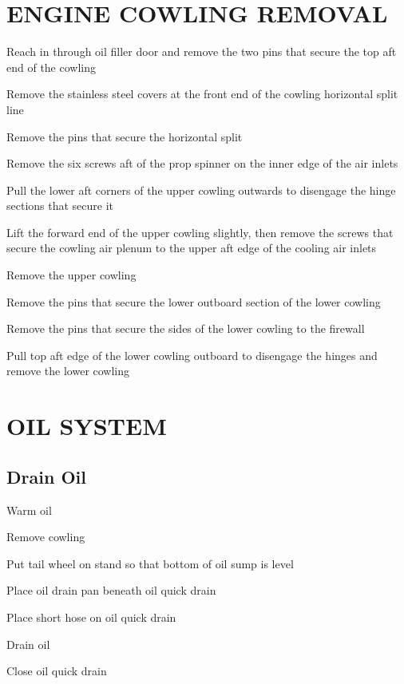 \section{ENGINE COWLING REMOVAL}
\begin{enumerate*}
    \item Reach in through oil filler door and remove the two pins that secure the top aft end of the cowling
    \item Remove the stainless steel covers at the front end of the cowling horizontal split line
    \item Remove the pins that secure the horizontal split
    \item Remove the six screws aft of the prop spinner on the inner edge of the air inlets
    \item Pull the lower aft corners of the upper cowling outwards to disengage the hinge sections that secure it
    \item Lift the forward end of the upper cowling slightly, then remove the screws that secure the cowling air plenum to the upper aft edge of the cooling air inlets
    \item Remove the upper cowling
    \item Remove the pins that secure the lower outboard section of the lower cowling
    \item Remove the pins that secure the sides of the lower cowling to the firewall
    \item Pull top aft edge of the lower cowling outboard to disengage the hinges and remove the lower cowling
\end{enumerate*}

\section{OIL SYSTEM}
\subsection{Drain Oil}
\begin{enumerate*}
    \item Warm oil
    \item Remove cowling
    \item Put tail wheel on stand so that bottom of oil sump is level
    \item Place oil drain pan beneath oil quick drain
    \item Place short hose on oil quick drain
    \item Drain oil
    \item Close oil quick drain
\end{enumerate*}

